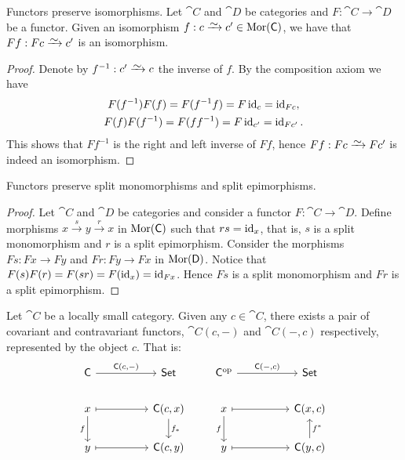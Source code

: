 \begin{lemma}\label{lem: functor preserve iso}
  Functors preserve isomorphisms. Let \(\cat C\) and \(\cat D\) be categories
  and \(F: \cat C \to \cat D\) be a functor. Given an isomorphism \(f: c \isoto
  c' \in \Mor(\cat C)\), we have that \(F f : F c \isoto c'\) is an isomorphism.
\end{lemma}

\begin{proof}
  Denote by \(f^{-1}: c' \isoto c\) the inverse of \(f\). By the composition
  axiom we have
  \begin{gather*}
    F (f^{-1}) F (f) = F (f^{-1} f) = F \operatorname{id}_c    = \operatorname{id}_{F c}, \\
    F (f) F (f^{-1}) = F (f f^{-1}) = F \operatorname{id}_{c'} = \operatorname{id}_{F c'}.
  \end{gather*}
  This shows that \(F f^{-1}\) is the right and left inverse of \(F f\), hence
  \(F f: F c \isoto F c'\) is indeed an isomorphism.
\end{proof}

\begin{lemma}
  Functors preserve split monomorphisms and split epimorphisms.
\end{lemma}

\begin{proof}
  Let \(\cat C\) and \(\cat D\) be categories and consider a functor \(F: \cat C
  \to \cat D\). Define morphisms \(x \xrightarrow s y \xrightarrow r x\) in
  \(\operatorname{Mor}(\mathsf C)\) such that \(r s = \operatorname{id}_x\), that is, \(s\) is a split
  monomorphism and \(r\) is a split epimorphism. Consider the morphisms \(F s: F
  x \to F y\) and \(F r: F y \to F x\) in \(\operatorname{Mor}(\mathsf D)\). Notice that \(F (s)
  F(r) = F(s r) = F(\operatorname{id}_x) = \operatorname{id}_{F x}\). Hence \(F s\) is a split monomorphism
and \(F r\) is a split epimorphism.
\end{proof}

\begin{definition}
  Let \(\cat C\) be a locally small category. Given any \(c \in \cat C\), there
  exists a pair of covariant and contravariant functors, \(\cat C(c, -)\) and
  \(\cat C(-, c)\) respectively, represented by the object \(c\). That is:
  \[
    \begin{tikzcd}
      \cat C \ar[rr, "\cat C{(c, -)}"] & & \cat{Set}
      \\
      x \ar[rr, maps to] \ar[d, swap, "f"]
      & & \cat C(c, x) \ar[d, "f_*"]
      \\
      y \ar[rr, maps to] & & \cat C(c, y)
    \end{tikzcd}
    \qquad
    \begin{tikzcd}
      \cat C^\op \ar[rr, "\cat C{(-, c)}"] & & \cat{Set}
      \\
      x \ar[rr, maps to] \ar[d, swap, "f"]
      & & \cat C(x, c)
      \\
      y \ar[rr, maps to] & & \cat C(y, c) \ar[u, swap, "f^*"]
    \end{tikzcd}
  \]
\end{definition}

